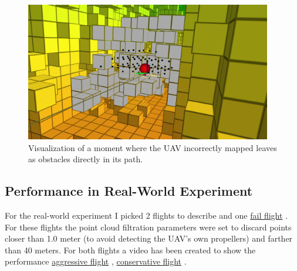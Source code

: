             \begin{figure}[htbp]
                \centering
                \includegraphics[width=0.96\textwidth]{./fig/rviz/deadlock_moment_mapping_gray.png}
                \caption{
                    Visualization of a moment where the \ac{UAV} incorrectly mapped leaves as obstacles directly in its path. 
                }
                \label{fig:map_fail}
            \end{figure}

        
        \subsection{Performance in Real-World Experiment}
            For the real-world experiment I picked 2 flights \cite{aggressive_flight, conservative_flight} to describe and one \href{https://www.youtube.com/watch?v=JVmW0qfwP3c}{fail flight}  \cite{flight_fail}. 
            For these flights the point cloud filtration parameters were set to discard points closer than 1.0 meter (to avoid detecting the \ac{UAV}'s own propellers) and farther than 40 meters.
            For both flights a video has been created to show the performance \href{https://www.youtube.com/watch?v=DFt222gnA_w&ab_channel=MichalKamler}{aggressive flight} \cite{aggressive_flight}, \href{https://www.youtube.com/watch?v=AJPk0yVCPUo&ab_channel=MichalKamler}{conservative flight} \cite{conservative_flight}.
            
